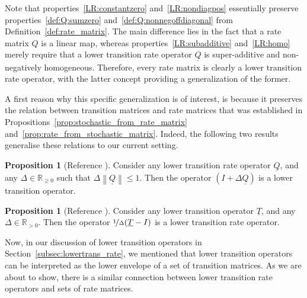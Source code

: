 \documentclass[10pt,a4paper]{paper}
\theoremstyle{definition}
\newtheorem{proposition}[theorem]{Proposition}
\newcommand{\reals}{\mathbb{R}}
\newcommand{\realspos}{\reals_{>0}}
\newcommand{\realsnonneg}{\reals_{\geq 0}}
\newcommand{\lt}{\underline{T}}
\newcommand{\lrate}{\underline{Q}}
\newcommand{\norm}[1]{\left\lVert #1 \right\rVert}
\begin{document}
Note that properties~\ref{LR:constantzero} and~\ref{LR:nondiagpos} essentially preserve properties~\ref{def:Q:sumzero} and~\ref{def:Q:nonnegoffdiagonal} from Definition~\ref{def:rate_matrix}. The main difference lies in the fact that a rate matrix $Q$ is a linear map, whereas properties~\ref{LR:subadditive} and~\ref{LR:homo} merely require that a lower transition rate operator $\lrate$ is super-additive and non-negatively homogeneous. Therefore, every rate matrix is clearly a lower transition rate operator, with the latter concept providing a generalization of the former.

A first reason why this specific generalization is of interest, is because it preserves the relation between transition matrices and rate matrices that was established in Propositions~\ref{prop:stochastic_from_rate_matrix} and~\ref{prop:rate_from_stochastic_matrix}. Indeed, the following two results generalise these relations to our current setting.


\begin{proposition}[Reference {\cite[Proposition 5]{DeBock:2016}}]\label{lemma:normQsmallenough}
Consider any lower transition rate operator $\lrate$, and any $\Delta\in\realsnonneg$ such that $\Delta\norm{\lrate}\leq 1$. Then the operator $(I+\Delta\lrate)$ is a lower transition operator.
\end{proposition}

\begin{proposition}[Reference {\cite[Proposition 6]{DeBock:2016}}]\label{lemma:lower_trans_to_lower_rate}
Consider any lower transition operator $\lt$, and any $\Delta\in\realspos$. Then the operator $\nicefrac{1}{\Delta}(\lt - I)$ is a lower transition rate operator.
\end{proposition}

Now, in our discussion of lower transition operators in Section~\ref{subsec:lowertrans_rate}, we mentioned that lower transition operators can be interpreted as the lower envelope of a set of transition matrices. As we are about to show, there is a similar connection between lower transition rate operators and sets of rate matrices.
\end{document}
